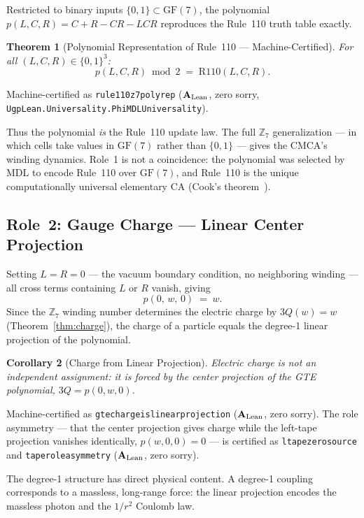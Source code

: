 \documentclass[11pt]{article}
\newtheorem{theorem}{Theorem}[section]
\newtheorem{corollary}[theorem]{Corollary}
\theoremstyle{remark}
\newcommand{\ZS}{\mathbb{Z}_7}
\newcommand{\lean}[1]{%
  \penalty-100
  \begingroup\def\_{\textunderscore\allowbreak}\texttt{#1}\endgroup}
\newcommand{\CatAL}{\ensuremath{\textbf{A}_{\rm Lean}}}
\newcommand{\CMCA}{\text{CMCA}}
\newcommand{\poly}{p(L,C,R)}
\newcommand{\polyform}{C+R-CR-LCR}
\newcommand{\FF}{\mathrm{GF}}
\begin{document}
Restricted to binary inputs $\{0,1\} \subset \FF(7)$, the polynomial
$\poly = \polyform$ reproduces the Rule~110 truth table exactly.

\begin{theorem}[Polynomial Representation of Rule~110 --- Machine-Certified]
\label{thm:r110-poly}
For all $(L,C,R) \in \{0,1\}^3$:
\[
  p(L,C,R) \bmod 2 \;=\; \mathrm{R110}(L,C,R).
\]
\end{theorem}
Machine-certified as \lean{rule110\_z7\_poly\_rep} ($\CatAL$, zero sorry,
\lean{UgpLean.Universality.\allowbreak PhiMDLUniversality}).

Thus the polynomial \emph{is} the Rule~110 update law.  The full
$\ZS$ generalization — in which cells take values in $\FF(7)$ rather
than $\{0,1\}$ — gives the $\CMCA$'s winding dynamics.  Role~1 is
not a coincidence: the polynomial was selected by MDL to encode
Rule~110 over $\FF(7)$, and Rule~110 is the unique computationally
universal elementary CA (Cook's theorem~\cite{Cook2004}).

\subsection{Role~2: Gauge Charge --- Linear Center Projection}
\label{sec:role-charge}

Setting $L = R = 0$ — the vacuum boundary condition, no neighboring
winding — all cross terms containing $L$ or $R$ vanish, giving
\[
  p(0,\, w,\, 0) \;=\; w.
\]
Since the $\ZS$ winding number determines the electric charge by
$3Q(w) = w$ (Theorem~\ref{thm:charge}), the charge of a particle
equals the degree-1 linear projection of the polynomial.

\begin{corollary}[Charge from Linear Projection]
Electric charge is not an independent assignment: it is forced by
the center projection of the GTE polynomial, $3Q = p(0,w,0)$.
\end{corollary}

Machine-certified as \lean{gte\_charge\_is\_linear\_projection}
($\CatAL$, zero sorry).  The
role asymmetry — that the center projection gives charge while the
left-tape projection vanishes identically, $p(w,0,0) = 0$ — is
certified as \lean{l\_tape\_zero\_source} and
\lean{tape\_role\_asymmetry} ($\CatAL$, zero sorry).

The degree-1 structure has direct physical content.  A degree-1
coupling corresponds to a massless, long-range force: the linear
projection encodes the massless photon and the $1/r^2$ Coulomb law.
\end{document}
